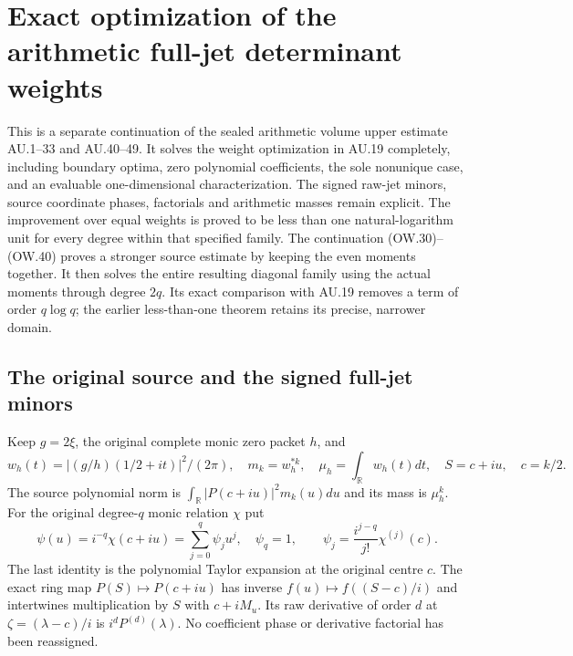 \begingroup
\def\C{\mathbb C}
\def\R{\mathbb R}
\def\diag{\operatorname{diag}}
\def\Tr{\operatorname{Tr}}
\section{Exact optimization of the arithmetic full-jet determinant weights}



This is a separate continuation of the sealed arithmetic volume upper
estimate AU.1--33 and AU.40--49. It solves the weight optimization in
AU.19 completely, including boundary optima, zero polynomial coefficients,
the sole nonunique case, and an evaluable one-dimensional characterization.
The signed raw-jet minors, source coordinate phases, factorials and
arithmetic masses remain explicit. The improvement over equal weights is
proved to be less than one natural-logarithm unit for every degree within
that specified family. The continuation (OW.30)--(OW.40) proves a stronger
source estimate by keeping the even moments together. It then solves the
entire resulting diagonal family using the actual moments through degree
$2q$. Its exact comparison with AU.19 removes a term of order $q\log q$;
the earlier less-than-one theorem retains its precise, narrower domain.

\subsection{The original source and the signed full-jet minors}

Keep $g=2\xi$, the original complete monic zero packet $h$, and
\[
 w_h(t)=|(g/h)(1/2+it)|^2/(2\pi),\quad
 m_k=w_h^{*k},\quad \mu_h=\int_\R w_h(t)dt,\quad
 S=c+iu,\quad c=k/2.                                      \tag{OW.1}
\]
The source polynomial norm is
$\int_\R|P(c+iu)|^2m_k(u)du$ and its mass is $\mu_h^k$.
For the original degree-$q$ monic relation $\chi$ put
\[
 \psi(u)=i^{-q}\chi(c+iu)=\sum_{j=0}^q\psi_ju^j,
 \quad\psi_q=1,\qquad
 \psi_j=\frac{i^{j-q}}{j!}\chi^{(j)}(c).                  \tag{OW.2}
\]
The last identity is the polynomial Taylor expansion at the original
centre $c$. The exact ring map $P(S)\mapsto P(c+iu)$ has inverse
$f(u)\mapsto f((S-c)/i)$ and intertwines multiplication by $S$ with
$c+iM_u$. Its raw derivative of order $d$ at
$\zeta=(\lambda-c)/i$ is $i^dP^{(d)}(\lambda)$.
No coefficient phase or derivative factorial has been reassigned.

